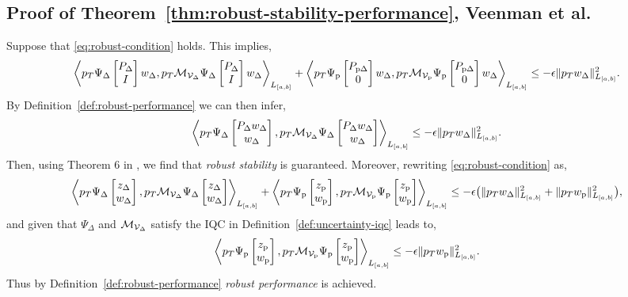 
\subsection{Proof of Theorem~\ref{thm:robust-stability-performance}, Veenman et al.~\cite{veenman2016robust}}\label{proof:robust-stability-performance}
Suppose that \eqref{eq:robust-condition} holds. This implies,
\begin{equation*}
\left\langle p_T \Psi_\Delta\begin{bmatrix}P_\Delta \\ I\end{bmatrix}w_\Delta, p_T\mathcal{M}_{\mathcal{V}_\Delta}\Psi_\Delta\begin{bmatrix}P_\Delta \\ I\end{bmatrix}w_\Delta \right\rangle_{L_{[a,b]}}
+\left\langle p_T \Psi_{{\mathrm{p}}}\begin{bmatrix}P_{{\mathrm{p}}\Delta} \\ 0\end{bmatrix}w_\Delta, p_T\mathcal{M}_{\mathcal{V}_{{\mathrm{p}}}}\Psi_{{\mathrm{p}}}\begin{bmatrix}P_{{\mathrm{p}}\Delta} \\ 0\end{bmatrix}w_\Delta \right\rangle_{L_{[a,b]}}
\leq -\epsilon \|p_Tw_\Delta\|^2_{L_{[a,b]}}.
\end{equation*}
By Definition~\ref{def:robust-performance} we can then infer,
\begin{equation*}
\left\langle p_T \Psi_\Delta\begin{bmatrix}P_\Delta w_\Delta \\ w_\Delta\end{bmatrix}, p_T\mathcal{M}_{\mathcal{V}_\Delta}\Psi_\Delta\begin{bmatrix}P_\Delta w_\Delta \\ w_\Delta\end{bmatrix} \right\rangle_{L_{[a,b]}}
\leq -\epsilon \|p_Tw_\Delta\|^2_{L_{[a,b]}}.
\end{equation*}
Then, using Theorem 6 in \cite{10156335}, we find that \emph{robust stability}
is guaranteed.
Moreover, rewriting \eqref{eq:robust-condition} as,
\begin{equation*}
\left\langle p_T\Psi_\Delta\begin{bmatrix}z_\Delta \\ w_\Delta\end{bmatrix}, p_T\mathcal{M}_{\mathcal{V}_\Delta}\Psi_\Delta\begin{bmatrix}z_\Delta \\ w_\Delta\end{bmatrix} \right\rangle_{L_{[a,b]}}
+\left\langle p_T\Psi_{{\mathrm{p}}}\begin{bmatrix}z_{{\mathrm{p}}} \\ w_{{\mathrm{p}}}\end{bmatrix}, p_T\mathcal{M}_{\mathcal{V}_{{\mathrm{p}}}}\Psi_{{\mathrm{p}}}\begin{bmatrix}z_{{\mathrm{p}}} \\ w_{{\mathrm{p}}}\end{bmatrix} \right\rangle_{L_{[a,b]}}
\leq -\epsilon\bigl(\|p_T{w_\Delta}\|^2_{L_{[a,b]}}
+\|p_T w_{{\mathrm{p}}}\|^2_{L_{[a,b]}}\bigr),
\end{equation*}
and given that $\Psi_\Delta$ and $\mathcal{M}_{\mathcal{V}_\Delta}$ satisfy the IQC in
Definition~\ref{def:uncertainty-iqc} leads to,
\begin{equation*}
\left\langle p_T\Psi_{{\mathrm{p}}}\begin{bmatrix}z_{{\mathrm{p}}} \\ w_{{\mathrm{p}}}\end{bmatrix}, p_T\mathcal{M}_{\mathcal{V}_{{\mathrm{p}}}}\Psi_{{\mathrm{p}}}\begin{bmatrix}z_{{\mathrm{p}}} \\ w_{{\mathrm{p}}}\end{bmatrix} \right\rangle_{L_{[a,b]}}
\leq -\epsilon \|p_T w_{{\mathrm{p}}}\|^2_{L_{[a,b]}}.
\end{equation*}
Thus by Definition~\ref{def:robust-performance} \emph{robust performance} is achieved.
